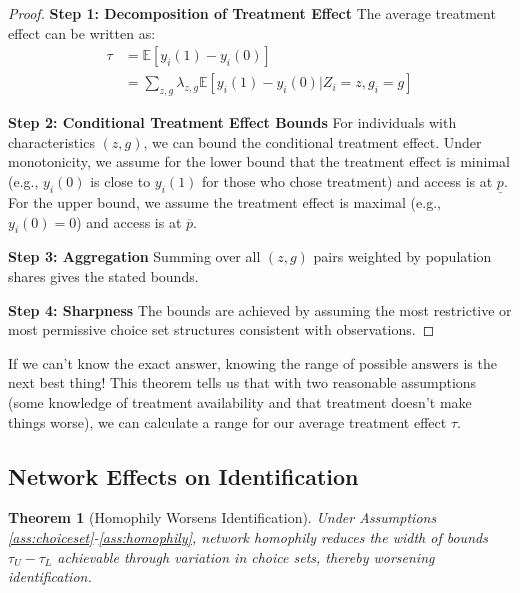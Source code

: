 \documentclass{article}
\newtheorem{theorem}{Theorem}
\newcommand{\E}{\mathbb{E}}
\begin{document}
\begin{proof}
\textbf{Step 1: Decomposition of Treatment Effect}
The average treatment effect can be written as:
\begin{align}
\tau &= \E[y_i(1) - y_i(0)] \\
&= \sum_{z,g} \lambda_{z,g} \E[y_i(1) - y_i(0) | Z_i = z, g_i = g] %
\end{align}

\textbf{Step 2: Conditional Treatment Effect Bounds}
For individuals with characteristics $(z,g)$, we can bound the conditional treatment effect. Under monotonicity, we assume for the lower bound that the treatment effect is minimal (e.g., $y_i(0)$ is close to $y_i(1)$ for those who chose treatment) and access is at $\underline{p}$. For the upper bound, we assume the treatment effect is maximal (e.g., $y_i(0)=0$) and access is at $\overline{p}$.

\textbf{Step 3: Aggregation}
Summing over all $(z,g)$ pairs weighted by population shares gives the stated bounds.

\textbf{Step 4: Sharpness}
The bounds are achieved by assuming the most restrictive or most permissive choice set structures consistent with observations.
\end{proof}

\begin{tcolorbox}[mycommentbox,title=bounds: getting a grip on uncertainty]
If we can't know the exact answer, knowing the range of possible answers is the next best thing! This theorem tells us that with two reasonable assumptions (some knowledge of treatment availability and that treatment doesn't make things worse), we can calculate a range for our average treatment effect $\tau$.
\end{tcolorbox}

\subsection{Network Effects on Identification}

\begin{theorem}[Homophily Worsens Identification]
\label{thm:network}
Under Assumptions \ref{ass:choiceset}-\ref{ass:homophily}, network homophily reduces the width of bounds $\tau_U - \tau_L$ achievable through variation in choice sets, thereby worsening identification. %
\end{theorem}
\end{document}
